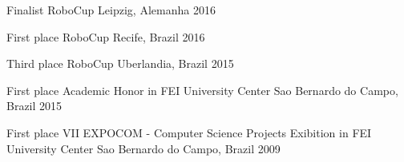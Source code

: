 



\begin{cvhonors}

  \cvhonor
    {Finalist} %
    {RoboCup \@Home} %
    {Leipzig, Alemanha} %
    {2016} %

\end{cvhonors}




\begin{cvhonors}

  \cvhonor
    {First place} %
    {RoboCup \@Home} %
    {Recife, Brazil} %
    {2016} %

  \cvhonor
    {Third place} %
    {RoboCup \@Home} %
    {Uberlandia, Brazil} %
    {2015} %

  \cvhonor
    {First place} %
    {Academic Honor in FEI University Center} %
    {Sao Bernardo do Campo, Brazil} %
    {2015} %

  \cvhonor
    {First place} %
    {VII EXPOCOM - Computer Science Projects Exibition in FEI University Center} %
    {Sao Bernardo do Campo, Brazil} %
    {2009} %

\end{cvhonors}
